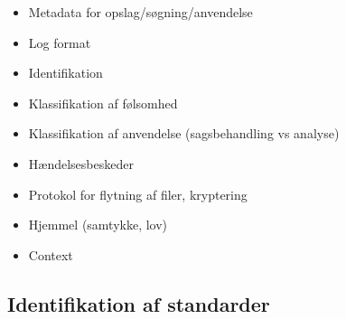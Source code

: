 \begin{itemize}
\tightlist
\item
  Metadata for opslag/søgning/anvendelse
\item
  Log format
\item
  Identifikation
\item
  Klassifikation af følsomhed
\item
  Klassifikation af anvendelse (sagsbehandling vs analyse)
\item
  Hændelsesbeskeder
\item
  Protokol for flytning af filer, kryptering
\item
  Hjemmel (samtykke, lov)
\item
  Context
\end{itemize}

\subsection{Identifikation af
standarder}\label{identifikation-af-standarder}
